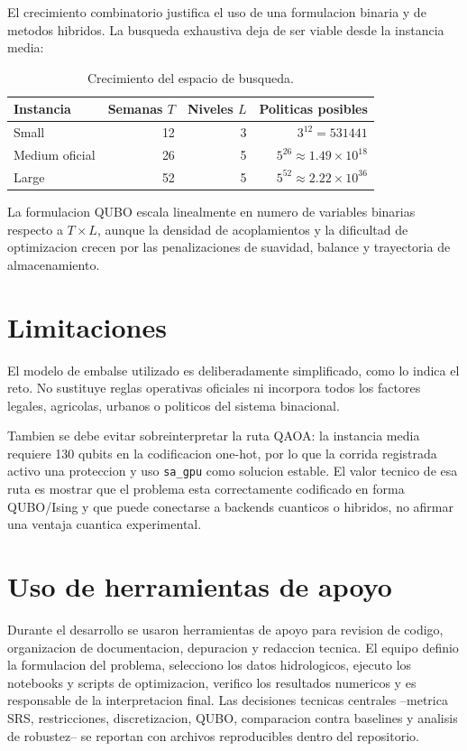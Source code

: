 \documentclass[11pt,letterpaper]{article}
\begin{document}
El crecimiento combinatorio justifica el uso de una formulacion binaria y de
metodos hibridos. La busqueda exhaustiva deja de ser viable desde la instancia
media:

\begin{table}[H]
\centering
\caption{Crecimiento del espacio de busqueda.}
\begin{tabular}{lrrr}
\toprule
Instancia & Semanas $T$ & Niveles $L$ & Politicas posibles \\
\midrule
Small & 12 & 3 & $3^{12}=531441$ \\
Medium oficial & 26 & 5 & $5^{26}\approx 1.49\times 10^{18}$ \\
Large & 52 & 5 & $5^{52}\approx 2.22\times 10^{36}$ \\
\bottomrule
\end{tabular}
\end{table}

La formulacion QUBO escala linealmente en numero de variables binarias
respecto a $T\times L$, aunque la densidad de acoplamientos y la dificultad de
optimizacion crecen por las penalizaciones de suavidad, balance y trayectoria
de almacenamiento.

\section{Limitaciones}

El modelo de embalse utilizado es deliberadamente simplificado, como lo indica
el reto. No sustituye reglas operativas oficiales ni incorpora todos los
factores legales, agricolas, urbanos o politicos del sistema binacional.

Tambien se debe evitar sobreinterpretar la ruta QAOA: la instancia media
requiere 130 qubits en la codificacion one-hot, por lo que la corrida
registrada activo una proteccion y uso \texttt{sa\_gpu} como solucion estable.
El valor tecnico de esa ruta es mostrar que el problema esta correctamente
codificado en forma QUBO/Ising y que puede conectarse a backends cuanticos o
hibridos, no afirmar una ventaja cuantica experimental.

\section{Uso de herramientas de apoyo}

Durante el desarrollo se usaron herramientas de apoyo para revision de codigo,
organizacion de documentacion, depuracion y redaccion tecnica. El equipo definio
la formulacion del problema, selecciono los datos hidrologicos, ejecuto los
notebooks y scripts de optimizacion, verifico los resultados numericos y es
responsable de la interpretacion final. Las decisiones tecnicas centrales
--metrica SRS, restricciones, discretizacion, QUBO, comparacion contra baselines
y analisis de robustez-- se reportan con archivos reproducibles dentro del
repositorio.
\end{document}
